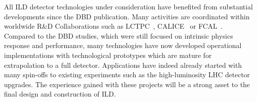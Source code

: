 All ILD detector technologies under consideration have benefited from substantial developments since the DBD publication. Many activities are coordinated within worldwide R\&D Collaborations such as LCTPC~\cite{ild:bib:TPC_lctpc}, CALICE~\cite{ild:bib:CALICE} or FCAL~\cite{ild:bib:FCAL}. Compared to the DBD studies, which were still focused on intrinsic physics response and performance, many technologies have now developed operational implementations with technological prototypes which are mature for extrapolation to a full detector. Applications have indeed already started with many spin-offs to existing experiments such as the high-luminosity LHC detector upgrades. The experience gained with these projects will be a strong asset to the final design and construction of ILD.  








